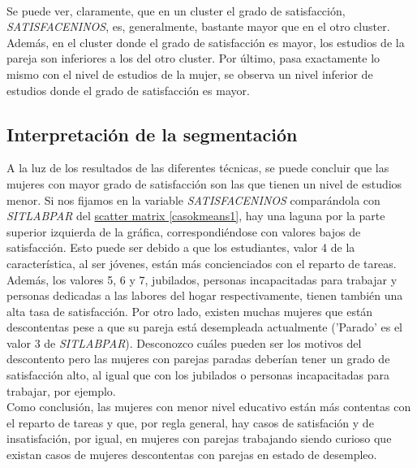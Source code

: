 \documentclass[paper=a4, fontsize=12pt]{article} %
\numberwithin{equation}{section} %
\numberwithin{figure}{section} %
\numberwithin{table}{section} %
\begin{document}
\begin{figure}[H]
    \centering
    \mbox {
    }
\end{figure}

Se puede ver, claramente, que en un cluster el grado de satisfacción, \textit{SATISFACENINOS}, es, generalmente, bastante mayor que en el otro cluster. Además, en el cluster donde el grado de satisfacción es mayor, los estudios de la pareja son inferiores a los del otro cluster. Por último, pasa exactamente lo mismo con el nivel de estudios de la mujer, se observa un nivel inferior de estudios donde el grado de satisfacción es mayor.

\subsection{Interpretación de la segmentación}

A la luz de los resultados de las diferentes técnicas, se puede concluir que las mujeres con mayor grado de satisfacción son las que tienen un nivel de estudios menor. Si nos fijamos en la variable \textit{SATISFACENINOS} comparándola con \textit{SITLABPAR} del \hyperref[casokmeans1]{scatter matrix \ref*{casokmeans1}}, hay una laguna por la parte superior izquierda de la gráfica, correspondiéndose con valores bajos de satisfacción. Esto puede ser debido a que los estudiantes, valor 4 de la característica, al ser jóvenes, están más concienciados con el reparto de tareas. Además, los valores 5, 6 y 7, jubilados, personas incapacitadas para trabajar y personas dedicadas a las labores del hogar respectivamente, tienen también una alta tasa de satisfacción. Por otro lado, existen muchas mujeres que están descontentas pese a que su pareja está desempleada actualmente ('Parado' es el valor 3 de \textit{SITLABPAR}). Desconozco cuáles pueden ser los motivos del descontento pero las mujeres con parejas paradas deberían tener un grado de satisfacción alto, al igual que con los jubilados o personas incapacitadas para trabajar, por ejemplo.\\

Como conclusión, las mujeres con menor nivel educativo están más contentas con el reparto de tareas y que, por regla general, hay casos de satisfación y de insatisfación, por igual, en mujeres con parejas trabajando siendo curioso que existan casos de mujeres descontentas con parejas en estado de desempleo.
\newpage
\end{document}
